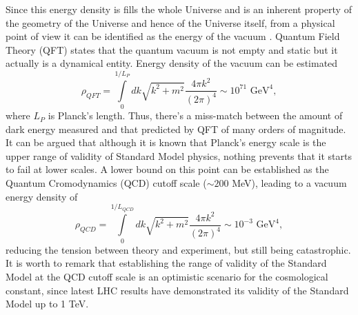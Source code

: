 Since this energy density is fills the whole Universe and is an inherent property of the geometry of the Universe and hence of the Universe itself, from a physical point of view it can be identified as the energy of the vacuum \cite{RevModPhys.61.1,2003PhR...380..235P}. Quantum Field Theory (QFT) states that the quantum vacuum is not empty and static but it actually is a dynamical entity. Energy density of the vacuum can be estimated
\begin{equation}
\rho_{QFT} = \int\limits_0^{1/L_P} dk \sqrt{k^2+m^2}\frac{4\pi k^2}{(2\pi)^4}\sim 10^{71}\mbox{ GeV}^4,
\end{equation}
where $L_P$ is Planck's length. Thus, there's a miss-match between the amount of dark energy measured and that predicted by QFT of many orders of magnitude. It can be argued that although it is known that Planck's energy scale is the upper range of validity of Standard Model physics, nothing prevents that it starts to fail at lower scales. A lower bound on this point can be established as the Quantum Cromodynamics (QCD) cutoff scale ($\sim 200$ MeV), leading to a vacuum energy density of
\begin{equation}
\rho_{QCD} = \int\limits_0^{1/L_{QCD}} dk \sqrt{k^2+m^2}\frac{4\pi k^2}{(2\pi)^4}\sim 10^{-3}\mbox{ GeV}^4,
\end{equation}
reducing the tension between theory and experiment, but still being catastrophic. It is worth to remark that establishing the range of validity of the Standard Model at the QCD cutoff scale is an optimistic scenario for the cosmological constant, since latest LHC results have demonstrated its validity of the Standard Model up to 1 TeV.

